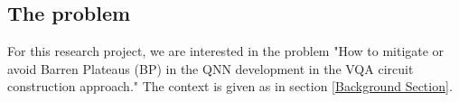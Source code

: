 \subsection{The problem}
For this research project, we are interested in the problem "How to mitigate or avoid Barren Plateaus (BP) in the QNN development in the VQA circuit construction approach." The context is given as in section \ref{Background Section}.